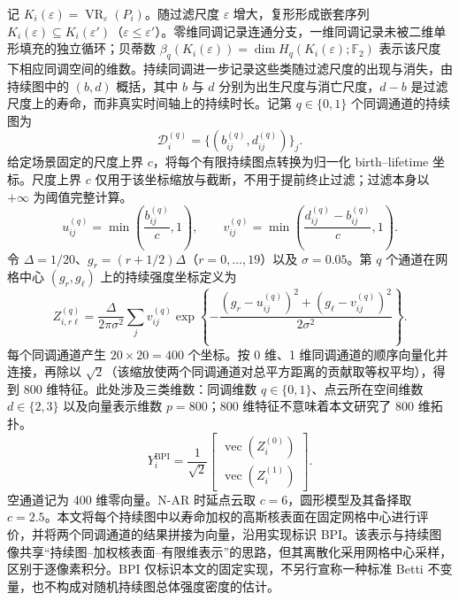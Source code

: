 记 $K_i(\varepsilon)=\operatorname{VR}_\varepsilon(P_i)$。随过滤尺度 $\varepsilon$ 增大，复形形成嵌套序列 $K_i(\varepsilon)\subseteq K_i(\varepsilon')$（$\varepsilon\le\varepsilon'$）。零维同调记录连通分支，一维同调记录未被二维单形填充的独立循环；贝蒂数 $\beta_q(K_i(\varepsilon))=\dim H_q(K_i(\varepsilon);\mathbb F_2)$ 表示该尺度下相应同调空间的维数。持续同调进一步记录这些类随过滤尺度的出现与消失，由持续图中的 $(b,d)$ 概括，其中 $b$ 与 $d$ 分别为出生尺度与消亡尺度，$d-b$ 是过滤尺度上的寿命，而非真实时间轴上的持续时长。记第 $q\in\{0,1\}$ 个同调通道的持续图为
\[
 \mathcal D_i^{(q)}=\{(b_{ij}^{(q)},d_{ij}^{(q)})\}_j.
\]
给定场景固定的尺度上界 $c$，将每个有限持续图点转换为归一化 birth--lifetime 坐标。尺度上界 $c$ 仅用于该坐标缩放与截断，不用于提前终止过滤；过滤本身以 $+\infty$ 为阈值完整计算。
\begin{equation}\label{eq:bpi-normalization}
 u_{ij}^{(q)}=\min\left(\frac{b_{ij}^{(q)}}{c},1\right),\qquad
 v_{ij}^{(q)}=\min\left(\frac{d_{ij}^{(q)}-b_{ij}^{(q)}}{c},1\right).
\end{equation}
令 $\Delta=1/20$、$g_r=(r+1/2)\Delta$（$r=0,\ldots,19$）以及 $\sigma=0.05$。第 $q$ 个通道在网格中心 $(g_r,g_\ell)$ 上的持续强度坐标定义为
\begin{equation}\label{eq:bpi}
 Z_{i,r\ell}^{(q)}
 =\frac{\Delta}{2\pi\sigma^2}
 \sum_j v_{ij}^{(q)}
 \exp\left\{-\frac{(g_r-u_{ij}^{(q)})^2+(g_\ell-v_{ij}^{(q)})^2}{2\sigma^2}\right\}.
\end{equation}
每个同调通道产生 $20\times20=400$ 个坐标。按 0 维、1 维同调通道的顺序向量化并连接，再除以 $\sqrt 2$（该缩放使两个同调通道对总平方距离的贡献取等权平均），得到 800 维特征。此处涉及三类维数：同调维数 $q\in\{0,1\}$、点云所在空间维数 $d\in\{2,3\}$ 以及向量表示维数 $p=800$；$800$ 维特征不意味着本文研究了 $800$ 维拓扑。
\begin{equation}\label{eq:bpi-vector}
 Y_i^{\mathrm{BPI}}
 =\frac{1}{\sqrt2}
 \begin{bmatrix}
   \operatorname{vec}(Z_i^{(0)})\\
   \operatorname{vec}(Z_i^{(1)})
 \end{bmatrix}.
\end{equation}
空通道记为 400 维零向量。N-AR 时延点云取 $c=6$，圆形模型及其备择取 $c=2.5$。本文将每个持续图中以寿命加权的高斯核表面在固定网格中心进行评价，并将两个同调通道的结果拼接为向量，沿用实现标识 BPI。该表示与持续图像共享“持续图--加权核表面--有限维表示”的思路，但其离散化采用网格中心采样，区别于逐像素积分\cite{Adams2017}。BPI 仅标识本文的固定实现，不另行宣称一种标准 Betti 不变量，也不构成对随机持续图总体强度密度的估计\cite{WuKimRinaldo2023}。

